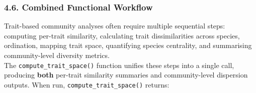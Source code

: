 \documentclass[
]{article}
\begin{document}
\hypertarget{combined-functional-workflow}{%
\subsubsection{4.6. Combined Functional
Workflow}\label{combined-functional-workflow}}

Trait-based community analyses often require multiple sequential steps:
computing per-trait similarity, calculating trait dissimilarities across
species, ordination, mapping trait space, quantifying species
centrality, and summarising community-level diversity metrics.\\
The \texttt{compute\_trait\_space()} function unifies these steps into a
single call, producing \textbf{both} per-trait similarity summaries and
community-level dispersion outputs. When run,
\texttt{compute\_trait\_space()} returns:
\end{document}
